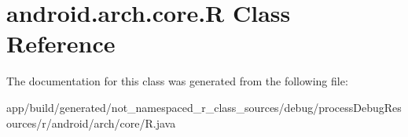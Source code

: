 \hypertarget{classandroid_1_1arch_1_1core_1_1_r}{}\section{android.\+arch.\+core.\+R Class Reference}
\label{classandroid_1_1arch_1_1core_1_1_r}


The documentation for this class was generated from the following file\+:\begin{DoxyCompactItemize}
\item 
app/build/generated/not\+\_\+namespaced\+\_\+r\+\_\+class\+\_\+sources/debug/process\+Debug\+Resources/r/android/arch/core/R.\+java\end{DoxyCompactItemize}
